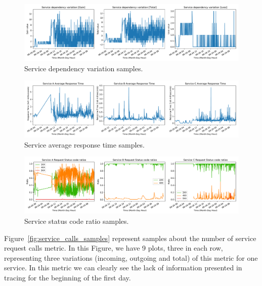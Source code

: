 \begin{figure}[H]
    \centering
    \includegraphics[width=1.00\textwidth]{images/service_dependency_variation.pdf}
    \caption{Service dependency variation samples.}
    \label{fig:service_dependency_variation}
\end{figure}

\begin{figure}[H]
    \centering
    \includegraphics[width=1.00\textwidth]{images/service_avg_response_time.pdf}
    \caption{Service average response time samples.}
    \label{fig:service_avg_response_time_samples}
\end{figure}


\begin{figure}[H]
    \centering
    \includegraphics[width=1.00\textwidth]{images/service_status_code_ratio.pdf}
    \caption{Service status code ratio samples.}
    \label{fig:service_status_code_ratio_samples}
\end{figure}

Figure~\ref{fig:service_calls_samples} represent samples about the number of service request calls metric. In this Figure, we have 9 plots, three in each row, representing three variations (incoming, outgoing and total) of this metric for one service. In this metric we can clearly see the lack of information presented in tracing for the beginning of the first day.

